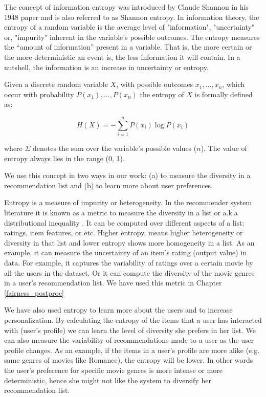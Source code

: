         The concept of information entropy was introduced by Claude Shannon in his 1948 paper \cite{entropy1948} and is also referred to as Shannon entropy. In information theory, the entropy of a random variable is the average level of "information", "uncertainty" or, "impurity" inherent in the variable's possible outcomes. The entropy measures the “amount of information” present in a variable. That is, the more certain or the more deterministic an event is, the less information it will contain. In a nutshell, the information is an increase in uncertainty or entropy. 
        
        Given a discrete random variable $X$, with possible outcomes $x_{1},...,x_{n}$, which occur with probability $P(x_1),...,P(x_n)$
         the entropy of $X$ is formally defined as:
         
         \begin{equation}
            H(X)=-\sum_{i=1}^{n}P(x_{i})\log P(x_{i})
         \end{equation}

        where $\Sigma$ denotes the sum over the variable's possible values ($n$). The value of entropy always lies in the range (0, 1).
        
        We use this concept in two ways in our work: (a) to measure the diversity in a recommendation list and (b) to learn more about user preferences.
        
        Entropy is a measure of impurity or heterogeneity. In the recommender system literature it is known as a metric to measure the diversity in a list or a.k.a distributional inequality . It can be computed over different aspects of a list: ratings, item features, or etc.
        Higher entropy, means higher heterogeneity or diversity in that list and lower entropy shows more homogeneity in a list. As an example, it can measure the uncertainty of an item’s rating (output value) in data. For example, it captures the variability of ratings over a certain movie by all the users in the dataset. Or it can compute the diversity of the movie genres in a user's recommendation list. We have used this metric in Chapter \ref{fairness_postproc} 
        
        We have also used entropy to learn more about the users and to increase personalization. By calculating the entropy of the items that a user has interacted with (user's profile) we can learn the level of diversity she prefers in her list. We can also measure the variability of recommendations made to a user as the user profile changes. 
        As an example, if the items in a user's profile are more alike (e.g. same genres of movies like Romance), the entropy will be lower. In other words the user's preference for specific movie genres is more intense or more deterministic, hence she might not like the system to diversify her recommendation list.
        
